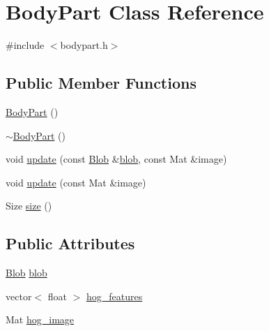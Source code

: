 \hypertarget{class_body_part}{
\section{BodyPart Class Reference}
\label{class_body_part}
}


{\ttfamily \#include $<$bodypart.h$>$}

\subsection*{Public Member Functions}
\begin{DoxyCompactItemize}
\item 
\hyperlink{class_body_part_a9599eb919a1223d5597f85fedd74085a}{BodyPart} ()
\item 
\hyperlink{class_body_part_a0d51eaacbf15745175b21bf44f67a92a}{$\sim$BodyPart} ()
\item 
void \hyperlink{class_body_part_a28774f4b49bb9f45a9d93aecb48ca35c}{update} (const \hyperlink{class_blob}{Blob} \&\hyperlink{class_body_part_a21a062ca3c7c36b43d706c364adaca5d}{blob}, const Mat \&image)
\item 
void \hyperlink{class_body_part_a773194f7743a0ef3caba005bf889db9f}{update} (const Mat \&image)
\item 
Size \hyperlink{class_body_part_a2a68dbe49c4ebe6b92f78c6c666a2790}{size} ()
\end{DoxyCompactItemize}
\subsection*{Public Attributes}
\begin{DoxyCompactItemize}
\item 
\hyperlink{class_blob}{Blob} \hyperlink{class_body_part_a21a062ca3c7c36b43d706c364adaca5d}{blob}
\item 
vector$<$ float $>$ \hyperlink{class_body_part_ade0cc8a87533c1b94de1e2d791524384}{hog\_\-features}
\item 
Mat \hyperlink{class_body_part_a3c20909c91e11e91f1eb62bda30d4963}{hog\_\-image}
\end{DoxyCompactItemize}


